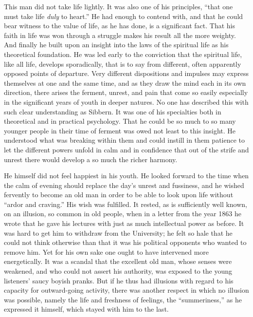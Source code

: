 \documentclass[12pt,a4paper,openany]{book}
\newcommand{\opage}[1]{\marginnote{\footnotesize\textit{[#1]}}}
\begin{document}
This man did not take life lightly. It was
also one of his principles, ``that one must take life
\emph{duly} to heart.'' He had enough to contend with, and that he
could bear witness to the value of life, as he has done, is a
significant fact. That his faith in life was won through a
struggle makes his result all the more weighty. And
finally he built upon an insight into the laws of the spiritual life
as his theoretical foundation. He was led early to the
conviction that the spiritual life, like all life, develops
sporadically, that is to say from different, often
apparently opposed points of departure. Very different dispositions
and impulses may express themselves at one and the same time, and as they draw
the mind each in its own direction, there arises the ferment, unrest, and
\opage{74}pain that come so easily especially in the significant
years of youth in deeper natures. No one has described this with
such clear understanding as Sibbern. It was one of his
specialties both in theoretical and in practical
psychology. That he could be so much to so many younger people
in their time of ferment was owed not least to this insight.
He understood what was breaking within them and could instill in them
patience to let the different powers unfold in
calm and in confidence that out of the strife and unrest there would develop
a so much the richer harmony.

He himself did not feel happiest in his youth. He
looked forward to the time when the calm of evening should replace the day's
unrest and fussiness, and he wished fervently to become
an old man in order to be able to look upon life without ``ardor and craving.''
His wish was fulfilled. It rested, as is sufficiently
well known, on an illusion, so common in old
people, when in a letter from the year 1863 he wrote that he gave
his lectures with just as much intellectual power as before.
It was hard to get him to withdraw from the
University; he felt so hale that he could not
think otherwise than that it was his political opponents
who wanted to remove him. Yet for his own sake one ought
to have intervened more energetically. It was a scandal that
the excellent old man, whose senses were
weakened, and who could not assert his authority,
was exposed to the young listeners' saucy boyish pranks. But if he
thus had illusions with regard to his capacity for outward-going
activity, there was another respect in which
no illusion was possible, namely the life and freshness of feelings,
the ``summeriness,'' as he expressed it himself, which stayed
with him to the last.
\end{document}
